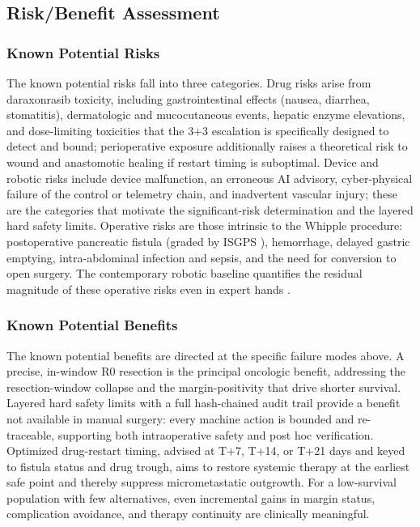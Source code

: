 \subsection{Risk/Benefit Assessment}

\subsubsection{Known Potential Risks}

The known potential risks fall into three categories. Drug risks arise from
daraxonrasib toxicity, including gastrointestinal effects (nausea, diarrhea,
stomatitis), dermatologic and mucocutaneous events, hepatic enzyme elevations,
and dose-limiting toxicities that the 3+3 escalation is specifically designed to
detect and bound; perioperative exposure additionally raises a theoretical risk
to wound and anastomotic healing if restart timing is suboptimal. Device and
robotic risks include device malfunction, an erroneous AI advisory, cyber-physical
failure of the control or telemetry chain, and inadvertent vascular injury; these
are the categories that motivate the significant-risk determination and the
layered hard safety limits. Operative risks are those intrinsic to the Whipple
procedure: postoperative pancreatic fistula (graded by ISGPS \cite{Bassi2017}),
hemorrhage, delayed gastric emptying, intra-abdominal infection and sepsis, and
the need for conversion to open surgery. The contemporary robotic baseline
quantifies the residual magnitude of these operative risks even in expert hands
\cite{DutchCohort2025}.

\subsubsection{Known Potential Benefits}

The known potential benefits are directed at the specific failure modes above. A
precise, in-window R0 resection is the principal oncologic benefit, addressing the
resection-window collapse and the margin-positivity that drive shorter survival.
Layered hard safety limits with a full hash-chained audit trail provide a
benefit not available in manual surgery: every machine action is bounded and
re-traceable, supporting both intraoperative safety and post hoc verification.
Optimized drug-restart timing, advised at T+7, T+14, or T+21 days and keyed to
fistula status and drug trough, aims to restore systemic therapy at the earliest
safe point and thereby suppress micrometastatic outgrowth. For a low-survival
population with few alternatives, even incremental gains in margin status,
complication avoidance, and therapy continuity are clinically meaningful.

